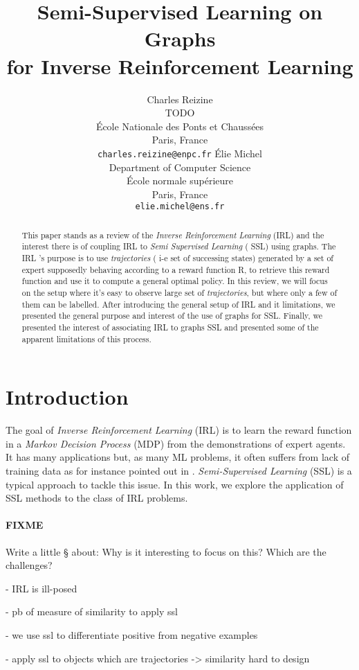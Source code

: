 \documentclass{article}
\title{Semi-Supervised Learning on Graphs \\
for Inverse Reinforcement Learning}
\author{
Charles Reizine\\
TODO\\
École Nationale des Ponts et Chaussées\\
Paris, France\\
\texttt{charles.reizine@enpc.fr}
\And
Élie Michel\\
Department of Computer Science\\
École normale supérieure\\
Paris, France\\
\texttt{elie.michel@ens.fr}
}
\begin{document}
\maketitle

\begin{abstract}
This paper stands as a review of the \emph{Inverse Reinforcement Learning} (IRL) and the interest there is of coupling IRL to \emph{Semi Supervised Learning} ( SSL) using graphs. The IRL 's purpose is to use  \emph{trajectories} ( i-e set of successing states) generated by a set of expert supposedly behaving according to a reward function R, to retrieve this reward function and use it to compute a general optimal policy. In this review, we will focus on the setup where it's easy to observe large set of \emph{trajectories}, but where only a few of them can be labelled. After introducing the general setup of IRL and it limitations, we presented the general purpose and interest of the use of graphs for SSL. Finally, we presented the interest of associating IRL to graphs SSL and presented some of the apparent limitations of this process. 
\end{abstract}

\section{Introduction}

The goal of \emph{Inverse Reinforcement Learning} (IRL) is to learn the reward function in a \emph{Markov Decision Process} (MDP) from the demonstrations of expert agents. It has many applications \cite{Kaelbling96} but, as many ML problems, it often suffers from lack of training data as for instance pointed out in \cite{Vasquez14}. \emph{Semi-Supervised Learning} (SSL) is a typical approach to tackle this issue. In this work, we explore the application of SSL methods to the class of IRL problems.

\paragraph{FIXME}
Write a little § about:
Why is it interesting to focus on this?
Which are the challenges?

 - IRL is ill-posed

 - pb of measure of similarity to apply ssl
 
 - we use ssl to differentiate positive from negative examples

 - apply ssl to objects which are trajectories -> similarity hard to design
\end{document}
